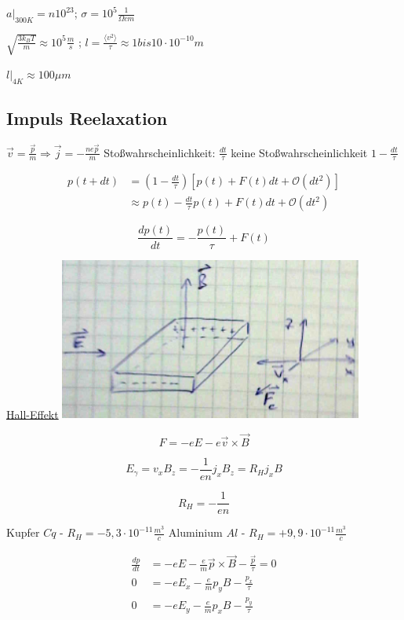 \(\left. a\right|_{300K} = n 10^{23}\); \(\sigma = 10^{5}\frac{1}{\Omega cm}\)

\(\sqrt{\frac{3k_BT}{m}}\approx 10^5\frac{m}{s}\) ; \(l=\frac{\langle v^2\rangle }{\tau}\approx 1 bis 10\cdot 10^{-10}m\)

\(\left. l \right|_{4K}\approx 100\mu m\)

\subsection{Impuls Reelaxation}

\(\vec v = \frac{\vec p}{m} \Rightarrow \vec j = -\frac{ne\vec p}{m}\) Stoßwahrscheinlichkeit: \(\frac{dt}{\tau}\)
keine Stoßwahrscheinlichkeit \(1-\frac{dt}{\tau}\)


\begin{align}
p(t+dt) &= (1-\frac{dt}{\tau})[p(t) + F(t)dt+\mathcal O(dt^2)]\\
&\approx p(t) -\frac{dt}{\tau}p(t) + F(t)dt+\mathcal O(dt^2)
\end{align}

\[\boxed{\frac{dp(t)}{dt}=-\frac{p(t)}{\tau}+F(t)}\]


\underline{Hall-Effekt}
\includegraphics[width=0.75\textwidth]{kap06_19.png}

\[ F = -eE-e\vec v\times \vec B\]

\[E_\gamma = v_xB_z = -\frac{1}{en}j_x B_z = R_H j_xB\]

\[\boxed{R_H=-\frac{1}{en}}\]

Kupfer \(Cq\) - \(R_H=-5,3\cdot 10^{-11}\frac{m^3}{c}\)
Aluminium \(Al\) - \(R_H=+9,9\cdot 10^{-11}\frac{m^3}{c}\)



\begin{align}
\frac{dp}{dt} &= -eE - \frac{e}{m}\vec p \times \vec B - \frac{\vec p}{\tau} = 0\\
0&=-eE_x - \frac{e}{m}p_yB - \frac{p_x}{\tau}\\
0&=-eE_y - \frac{e}{m}p_xB - \frac{p_y}{\tau}
\end{align}

